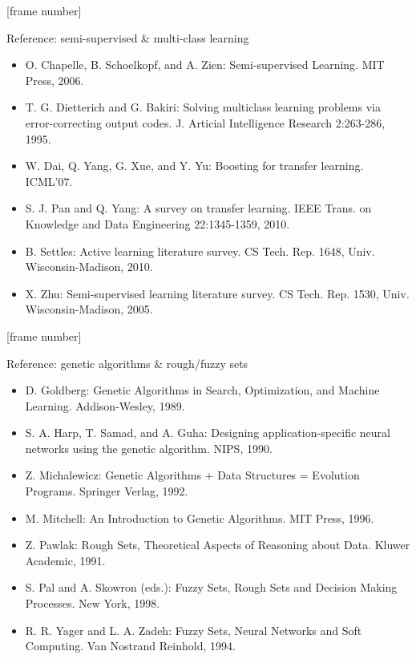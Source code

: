 \documentclass[aspectratio=169,t,table]{beamer}
\begin{document}
  {
    [frame number]
    \begin{frame}{Reference: semi-supervised \& multi-class learning}
      \begin{itemize}
        \item O. Chapelle, B. Schoelkopf, and A. Zien: Semi-supervised Learning. MIT Press, 2006.
        \item T. G. Dietterich and G. Bakiri: Solving multiclass learning problems via error-correcting output codes. J. Articial Intelligence Research 2:263-286, 1995.
        \item W. Dai, Q. Yang, G. Xue, and Y. Yu: Boosting for transfer learning. ICML'07.
        \item S. J. Pan and Q. Yang: A survey on transfer learning. IEEE Trans. on Knowledge and Data Engineering 22:1345-1359, 2010.
        \item B. Settles: Active learning literature survey. CS Tech. Rep. 1648, Univ. Wisconsin-Madison, 2010.
        \item X. Zhu: Semi-supervised learning literature survey. CS Tech. Rep. 1530, Univ. Wisconsin-Madison, 2005.
      \end{itemize}
    \end{frame}
  }

  {
    [frame number]
    \begin{frame}{Reference: genetic algorithms \& rough/fuzzy sets}
      \begin{itemize}
        \item D. Goldberg: Genetic Algorithms in Search, Optimization, and Machine Learning. Addison-Wesley, 1989.
        \item S. A. Harp, T. Samad, and A. Guha: Designing application-specific neural networks using the genetic algorithm. NIPS, 1990.
        \item Z. Michalewicz: Genetic Algorithms + Data Structures = Evolution Programs. Springer Verlag, 1992.
        \item M. Mitchell: An Introduction to Genetic Algorithms. MIT Press, 1996.
        \item Z. Pawlak: Rough Sets, Theoretical Aspects of Reasoning about Data. Kluwer Academic, 1991.
        \item S. Pal and A. Skowron (eds.): Fuzzy Sets, Rough Sets and Decision Making Processes. New York, 1998.
        \item R. R. Yager and L. A. Zadeh: Fuzzy Sets, Neural Networks and Soft Computing. Van Nostrand Reinhold, 1994.
      \end{itemize}
    \end{frame}
  }
\end{document}
